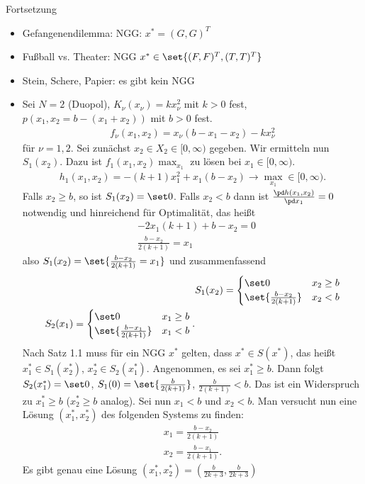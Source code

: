 \begin{beispiel*}Fortsetzung

  \begin{itemize}
  \item Gefangenendilemma: NGG: $x^{*} = (G, G)^{T}$
  \item Fußball vs. Theater: NGG $x^{*} \in \set{(F, F)^{T}, (T, T)^{T}}$
  \item Stein, Schere, Papier: es gibt kein NGG
  \item Sei $N = 2$ (Duopol), $K_{\nu}(x_{\nu}) = k x_{\nu}^{2}$ mit $k > 0 $ fest, $p(x_{1}, x_{2} = b - (x_{1} + x_{2}))$ mit $b > 0$ fest.
    \begin{align*}
      f_{\nu}(x_{1}, x_{2}) = x_{\nu}(b - x_{1}- x_{2}) - k x_{\nu}^{2}
    \end{align*}
für $\nu = 1,2$. Sei zunächst $x_{2} \in X_{2} \in [0, \infty)$ gegeben. Wir ermitteln nun $S_{1}(x_{2})$. Dazu ist $f_{1}(x_{1}, x_{2}) \max_{x_{1}}$ zu lösen bei $x_{1} \in [0, \infty)$.
\begin{align}\label{eq:h_opt}
  h_{1}(x_{1}, x_{2}) = - (k + 1)x_{1}^{2} + x_{1}(b - x_{2}) \to \max_{ x_{1}} \in [0, \infty). 
\end{align}
Falls $x_{2} \geq b$, so ist $S_{1}(x_{2}) = \set 0$. Falls $x_{2} < b$ dann ist $\frac {\pd h(x_{1}, x_{2})}{\pd x_{1}} = 0$ notwendig und hinreichend für Optimalität, das heißt
\begin{align*}
&  - 2 x_{1}(k + 1) + b - x_{2} = 0\\
&  \frac{b - x_{2}}{2(k + 1)} = x_{1}
\end{align*}
also $S_{1}(x_{2}) = \set{ \frac{b - x_{2}}{2(k + 1)} = x_{1}}$ und zusammenfassend
\begin{align*}
&  S_{1}(x_{2}) =
  \begin{cases}
    \set 0 & x_{2}\geq b \\
     \set{\frac{b - x_{2}}{2(k + 1)}} & x_{2}< b
  \end{cases}\\
  S_{2}(x_{1}) =
  \begin{cases}
    \set 0 & x_{1}\geq b \\
     \set{\frac{b - x_{1}}{2(k + 1)}} & x_{1}< b
  \end{cases}.
\end{align*}
Nach Satz 1.1 muss für ein NGG $x^{*}$ gelten, dass $x^{*} \in S(x^{*})$, das heißt $x_{1}^{*} \in S_{1}(x_{2}^{*})$, $x_{2}^{*} \in S_{2}(x_{1}^{*})$. Angenommen, es sei $x_{1}^{*}\geq b$. Dann folgt $S_{2}(x_{1}^{*}) = \set 0$, $S_{1}(0) = \set{\frac{b}{2(k + 1)}}$, $\frac b {2(k + 1)}< b$. Das ist ein Widerspruch zu $x_{1}^{*}\geq b$ ($x_{2}^{*} \geq b$ analog).
Sei nun $x_{1}<b$ und $x_{2}<b$. Man versucht nun eine Lösung $(x_{1}^{*}, x_{2}^{*})$ des folgenden Systems zu finden:
\begin{align*}
  x_{1} = \frac{b-x_{2}}{2(k + 1)}\\
  x_{2} = \frac{b-x_{1}}{2(k + 1)}.
\end{align*}
Es gibt genau eine Lösung $(x_{1}^{*}, x_{2}^{*}) = \left(\frac{b}{2k + 3}, \frac{b}{2k + 3} \right)$
  \end{itemize}
\end{beispiel*}
